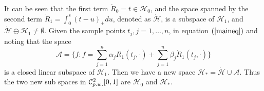 It can be seen that the first term $\dot{R}_0=t\in \mathcal{H}_0$, and the space spanned by the second term $\dot{R}_1=\int_0^s(t-u)_+du$, denoted as $\mathcal{\dot{H}}$, is a subspace of $\mathcal{H}_1$, and $\mathcal{\dot{H}} \ominus \mathcal{H}_1\neq \emptyset$. Given the sample points $t_j, j=1, \ldots, n$, in equation $(\ref{maineq})$ and noting that the space
\begin{equation*}
\mathcal{A}=\{f: f=\sum_{j=1}^{n}\alpha_jR_1(t_j,\cdot)+\sum_{j=1}^{n}\beta_j\dot{R}_1(t_j,\cdot)\} 
\end{equation*}
is a closed linear subspace of $\mathcal{H}_1$. Then we have a new space $\mathcal{H}_*=\mathcal{\dot{H}} \cup \mathcal{A}$. Thus the two new sub spaces in $\mathcal{C}_{\footnotesize p.w.}^2[0,1]$ are $\mathcal{H}_0$ and $\mathcal{H}_*$.


